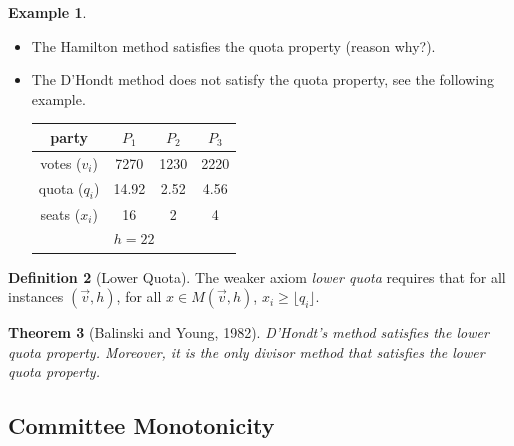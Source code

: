 \documentclass{book}
\theoremstyle{plain}
\newtheorem{theorem}{Theorem}[subsection]
\theoremstyle{definition}
\newtheorem{definition}[theorem]{Definition}
\newtheorem{example}[theorem]{Example}
\theoremstyle{remark}
\begin{document}
\begin{example}
    \leavevmode \\
    \begin{itemize}
        \item The Hamilton method satisfies the quota property (reason why?).
        \item The D'Hondt method does not satisfy the quota property, 
        see the following example.
        \begin{center}
        \begin{tabular}{c c c c}
            \hline
            party & $P_1$ & $P_2$ & $P_3$ \\
            \hline
            votes ($v_i$) & 7270 & 1230 & 2220 \\
            quota ($q_i$) & 14.92 & 2.52 & 4.56 \\
            seats ($x_i$) & 16 & 2 & 4 \\
            \hline
            \multicolumn{4}{c}{$h = 22$}
        \end{tabular}
        \end{center}
    \end{itemize}
\end{example}

\begin{definition}[Lower Quota]
    The weaker axiom 
    \emph{lower quota} requires that
    for all instances $(\vec{v}, h)$, for all $x \in M(\vec{v}, h)$,
    $x_i \geq \lfloor q_i \rfloor$.
\end{definition}

\begin{theorem}[Balinski and Young, 1982]
    D'Hondt's method satisfies 
    the lower quota property.
    Moreover, it is the only 
    divisor method that satisfies the lower quota property.
\end{theorem}


\subsection{Committee Monotonicity}
\end{document}
